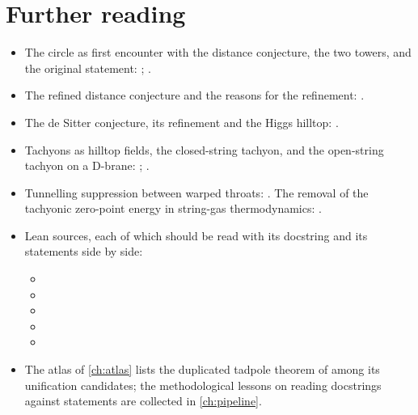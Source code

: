 \section*{Further reading}
\begin{itemize}[leftmargin=*,itemsep=1pt]
\item The circle as first encounter with the distance conjecture, the two towers, and the
 original statement: ; .
\item The refined distance conjecture and the reasons for the refinement:
 .
\item The de Sitter conjecture, its refinement and the Higgs hilltop:
 .
\item Tachyons as hilltop fields, the closed-string tachyon, and the open-string tachyon on a
 D-brane: ; .
\item Tunnelling suppression between warped throats: . The
 removal of the tachyonic zero-point energy in string-gas thermodynamics: .
\item Lean sources, each of which should be read with its docstring and its statements side by
 side:
 \begin{itemize}[leftmargin=*,itemsep=0pt]
 \item {}
 \item {}
 \item {}
 \item {}
 \item {}
 \end{itemize}
\item The atlas of \cref{ch:atlas} lists the duplicated tadpole theorem of
  among its unification candidates; the methodological lessons on reading
 docstrings against statements are collected in \cref{ch:pipeline}.
\end{itemize}
